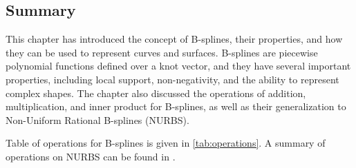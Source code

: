 \subsection{Summary}

This chapter has introduced the concept of B-splines, their properties, and how they can be used to represent curves and surfaces. B-splines are piecewise polynomial functions defined over a knot vector, and they have several important properties, including local support, non-negativity, and the ability to represent complex shapes. The chapter also discussed the operations of addition, multiplication, and inner product for B-splines, as well as their generalization to Non-Uniform Rational B-splines (NURBS).

Table of operations for B-splines is given in \cref{tab:operations}. A summary of operations on \acrshort{NURBS} can be found in \cite{piegl1997symbolic}.


